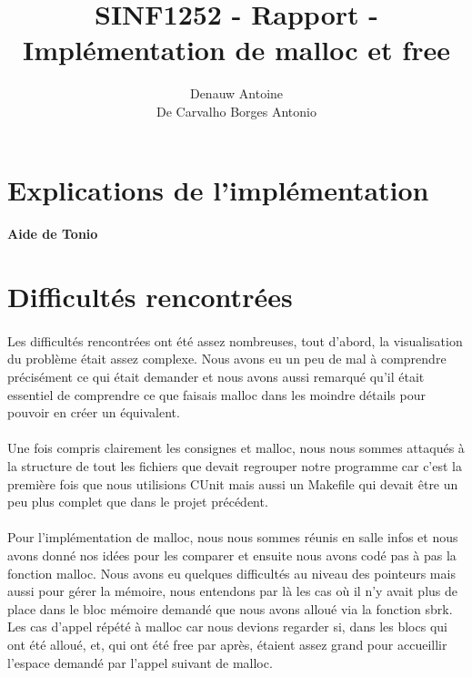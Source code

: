 \documentclass[10pt,a4paper]{article}
\begin{document}
\author{Denauw Antoine\\ De Carvalho Borges Antonio}
\title{SINF1252 - Rapport - Implémentation de malloc et free}
\maketitle

\tableofcontents


\newpage

\section{Explications de l'implémentation}

\paragraph{Aide de Tonio}


\section{Difficultés rencontrées}

\paragraph{}Les difficultés rencontrées ont été assez nombreuses, tout d'abord, la visualisation du problème était assez complexe. Nous avons eu un peu de mal à comprendre précisément ce qui était demander et nous avons aussi remarqué qu'il était essentiel de comprendre ce que faisais malloc dans les moindre détails pour pouvoir en créer un équivalent.

\paragraph{}Une fois compris clairement les consignes et malloc, nous nous sommes attaqués à la structure de tout les fichiers que devait regrouper notre programme car c'est la première fois que nous utilisions CUnit mais aussi un Makefile qui devait être un peu plus complet que dans le projet précédent.

\paragraph{}Pour l'implémentation de malloc, nous nous sommes réunis en salle infos et nous avons donné nos idées pour les comparer et ensuite nous avons codé pas à pas la fonction malloc. Nous avons eu quelques difficultés au niveau des pointeurs mais aussi pour gérer la mémoire, nous entendons par là les cas où il n'y avait plus de place dans le bloc mémoire demandé que nous avons alloué via la fonction sbrk. Les cas d'appel répété à malloc car nous devions regarder si, dans les blocs qui ont été alloué, et, qui ont été free par après, étaient assez grand pour accueillir l'espace demandé par l'appel suivant de malloc.
\end{document}
